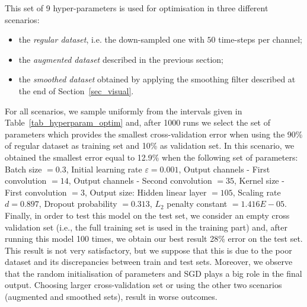 \documentclass{article}
\begin{document}
This set of 9  hyper-parameters is used for optimisation in three different scenarios: 
\begin{itemize}
\item the \emph{regular dataset}, i.e. the down-sampled one with $50$ time-steps per channel; 
\item the \emph{augmented dataset} described in the previous section;%
\item the \emph{smoothed dataset} obtained  by applying the smoothing filter described at the end of Section~\ref{sec_visual}.
\end{itemize}
For all scenarios, we sample uniformly from the intervals given in Table~\ref{tab_hyperparam_optim} and, after 1000 runs we select the set of parameters which provides the smallest cross-validation error when using the 90\% of regular dataset as training set and 10\% as validation set.
In this scenario, we obtained the smallest error equal to 12.9\%  when the following set of parameters:
Batch size $ =  0.3$,  Initial learning rate $\varepsilon  = 0.001$,  Output channels - First convolution  $= 14$, Output channels - Second convolution $= 35$, Kernel size - First convolution $= 3$, Output size: Hidden linear layer $ = 105$,  Scaling rate $d = 0.897$, Dropout probability $=  0.313$,  $L_2$ penalty constant $= 1.416E-05$.
Finally, in order to test this model on the test set, we consider an empty cross validation set (i.e., the full training set is used in the training part) and, after running this model 100 times, we obtain our best result  28\% error on the test set.
This result is not very satisfactory, but we suppose that this is due to the poor dataset and its discrepancies between train and test sets. 
 Moreover, we observe that the random initialisation of parameters and SGD plays a big role in the final output. 
Choosing larger cross-validation set or using  the other two scenarios (augmented  and smoothed sets), result in worse outcomes. 
  
  
\end{document}
